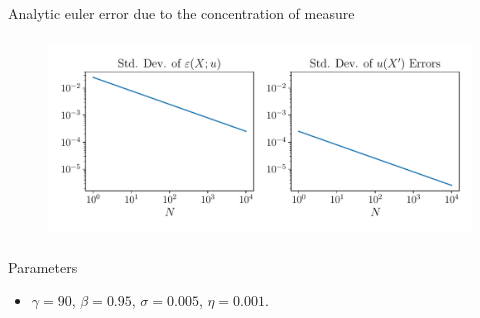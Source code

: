 \documentclass[aspectratio=169,10pt]{beamer}
\begin{document}
\begin{frame}{Analytic euler error due to the concentration of measure}
	
	\begin{figure}[h!]
		\centering
		\includegraphics[height = 2.1in]{./figures/concentration_euler_residual_linear.pdf}
	\end{figure}
\end{frame}		

\begin{frame}
	
	\renewcommand{\arraystretch}{1.2}
	\begin{table}[h!]
		\caption{Performance of Different Networks in Solving the Linear Model}\vspace{-0.1in}
		\begin{center}
		\end{center}
	\end{table}
	\renewcommand{\arraystretch}{1.0}
	
\end{frame}	


\begin{frame}
	
	\renewcommand{\arraystretch}{1.2}
	
	\begin{table}[h!]
		\caption{Nonlinear Model Performance}\vspace{-0.1in}
		\begin{center}
		\end{center}
	\end{table}
	
	\renewcommand{\arraystretch}{1.0}
	
\end{frame}	

\begin{frame}{Parameters}
	\begin{itemize}
		\item $\gamma = 90$, $\beta = 0.95$, $\sigma = 0.005$, $\eta = 0.001$.
	\end{itemize}
\end{frame}
\end{document}
